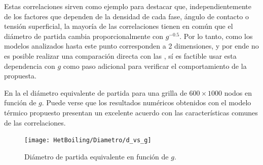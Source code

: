 
Estas correlaciones sirven como ejemplo para destacar que, independientemente de los factores que dependen de la densidad de cada fase, \'angulo de contacto o tensi\'on superficial, la mayor\'ia de las correlaciones tienen en com\'un que el di\'ametro de partida cambia proporcionalmente con $g^{-0.5}$. Por lo tanto, como los modelos analizados hasta este punto corresponden a 2 dimensiones, y por ende no es posible realizar una comparaci\'on directa con las , s\'i es factible usar esta dependencia con $g$ como paso adicional para verificar el comportamiento de la \lbe{} propuesta.

En la  el di\'ametro equivalente de partida para una grilla de $600\times 1000$ nodos en funci\'on de $g$. Puede verse que los resultados num\'ericos obtenidos con el modelo t\'ermico propuesto presentan un excelente acuerdo con las caracter\'isticas comunes de las correlaciones.

\begin{figure}[ht]
	\centering
	\texttt{[image: HetBoiling/Diametro/d\_vs\_g]}
	\caption{Di\'ametro de partida equivalente en funci\'on de $g$. }
	\label{fig:dvsg_2d}
\end{figure}







